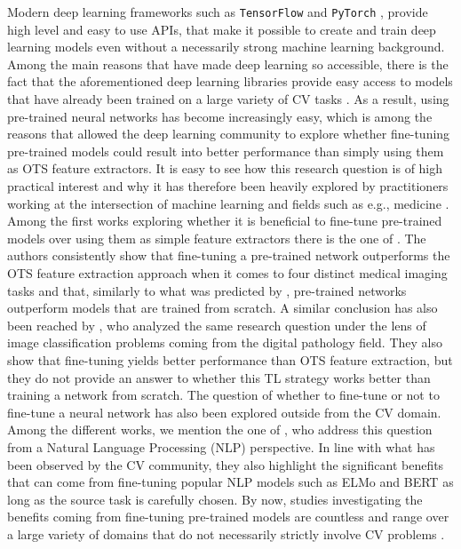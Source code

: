 Modern deep learning frameworks such as \texttt{TensorFlow} \cite{abadi2016tensorflow} and \texttt{PyTorch} \cite{paszke2017automatic}, provide high level and easy to use APIs, that make it possible to create and train deep learning models even without a necessarily strong machine learning background. Among the main reasons that have made deep learning so accessible, there is the fact that the aforementioned deep learning libraries provide easy access to models that have already been trained on a large variety of CV tasks \cite{russakovsky2015imagenet, lin2014microsoft, everingham2010pascal}. As a result, using pre-trained neural networks has become increasingly easy, which is among the reasons that allowed the deep learning community to explore whether fine-tuning pre-trained models could result into better performance than simply using them as OTS feature extractors. It is easy to see how this research question is of high practical interest and why it has therefore been heavily explored by practitioners working at the intersection of machine learning and fields such as e.g., medicine \cite{tajbakhsh2016convolutional,ho2021evaluation}. Among the first works exploring whether it is beneficial to fine-tune pre-trained models over using them as simple feature extractors there is the one of \citet{tajbakhsh2016convolutional}. The authors consistently show that fine-tuning a pre-trained network outperforms the OTS feature extraction approach when it comes to four distinct medical imaging tasks and that, similarly to what was predicted by \citet{zeiler2014visualizing}, pre-trained networks outperform models that are trained from scratch. A similar conclusion has also been reached by \citet{mormont2018comparison}, who analyzed the same research question under the lens of image classification problems coming from the digital pathology field. They also show that fine-tuning yields better performance than OTS feature extraction, but they do not provide an answer to whether this TL strategy works better than training a network from scratch. The question of whether to fine-tune or not to fine-tune a neural network has also been explored outside from the CV domain. Among the different works, we mention the one of \citet{peters2019tune}, who address this question from a Natural Language Processing (NLP) perspective. In line with what has been observed by the CV community, they also highlight the significant benefits that can come from fine-tuning popular NLP models such as ELMo \cite{peters2018deep} and BERT \cite{devlin2018bert} as long as the source task is carefully chosen. By now, studies investigating the benefits coming from fine-tuning pre-trained models are countless and range over a large variety of domains that do not necessarily strictly involve CV problems \cite{ackermann2018using,dominguez2019transfer,george2017deep,boulanger2013audio,deng2013new,kong2020panns,zarrella2016mitre,howard2018universal,houlsby2019parameter}.


